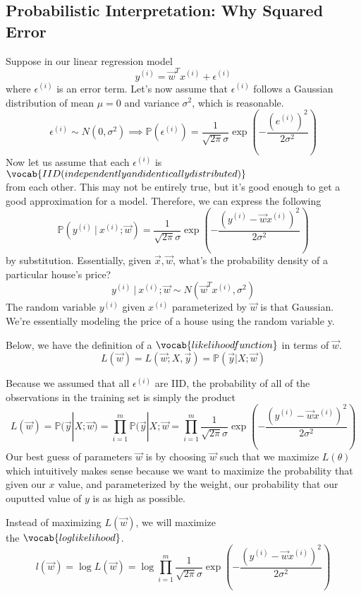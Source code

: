 \documentclass[12pt]{scrartcl}
\begin{document}
\subsection{Probabilistic Interpretation: Why Squared Error}

Suppose in our linear regression model
\[y^{(i)} = \vec{w}^Tx^{(i)} + \epsilon^{(i)}\]
where $\epsilon^{(i)}$ is an error term. Let's now assume that $\epsilon^{(i)}$ follows a Gaussian distribution of mean $\mu = 0$ and variance $\sigma^2$, which is reasonable.
\[\epsilon^{(i)} \sim N(0,\sigma^2) \implies \mathbb{P}(\epsilon^{(i)}) = \frac{1}{\sqrt{2\pi}\sigma}\exp(-\frac{(e^{(i)})^2}{2\sigma^2})\]
Now let us assume that each $\epsilon^{(i)}$ is $\vocab{IID (independently and identically distributed)}$ \\from each other. This may not be entirely true, but it's good enough to get a good approximation for a model. Therefore, we can express the following
\[\mathbb{P}(y^{(i)} \ | \ x^{(i)}; \vec{w}) = \frac{1}{\sqrt{2\pi}\sigma }\exp(-\frac{(y^{(i)} - \vec{w}x^{(i)})^2}{2\sigma^2})\]
by substitution.
Essentially, given $\vec{x}, \vec{w}$, what's the probability density of a particular house's price?
\[y^{(i)} \ | \ x^{(i)}; \vec{w} \sim N(\vec{w}^Tx^{(i)}, \sigma^2)\]
The random variable $y^{(i)}$ given $x^{(i)}$ parameterized by $\vec{w}$ is that Gaussian. We’re essentially modeling the price of a house using the random variable y.
\begin{definition}
Below, we have the definition of a $\vocab{likelihood function}$ in terms of $\vec{w}$.
\[L(\vec{w}) = L(\vec{w}; X, \vec{y}) = \mathbb{P}(\vec{y} | X; \vec{w})\]    
\end{definition}
Because we assumed that all $\epsilon^{(i)}$ are IID, the probability of all of the observations in the training set is simply the product
\[L(\vec{w}) = \mathbb{P}(\vec{y} | X; \vec{w}) = \prod_{i=1}^m \mathbb{P}(\vec{y} | X; \vec{w} = \prod_{i=1}^m \frac{1}{\sqrt{2\pi}\sigma }\exp(-\frac{(y^{(i)} - \vec{w}x^{(i)})^2}{2\sigma^2})\]
Our best guess of parameters $\vec{w}$ is by choosing $\vec{w}$ such that we maximize $L(\theta)$ which intuitively makes sense because we want to maximize the probability that given our $x$ value, and parameterized by the weight, our probability that our ouputted value of $y$ is as high as possible.
\begin{definition}
    Instead of maximizing $L(\vec{w})$, we will maximize \\the $\vocab{log likelihood}$.
\[l(\vec{w}) = \log L(\vec{w}) = \log \prod_{i=1}^m \frac{1}{\sqrt{2\pi}\sigma }\exp(-\frac{(y^{(i)} - \vec{w}x^{(i)})^2}{2\sigma^2})\]
\end{definition}
\end{document}
